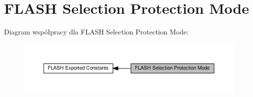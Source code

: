 \hypertarget{group___f_l_a_s_h_ex___selection___protection___mode}{}\section{F\+L\+A\+SH Selection Protection Mode}
\label{group___f_l_a_s_h_ex___selection___protection___mode}
Diagram współpracy dla F\+L\+A\+SH Selection Protection Mode\+:\nopagebreak
\begin{figure}[H]
\begin{center}
\leavevmode
\includegraphics[width=350pt]{group___f_l_a_s_h_ex___selection___protection___mode}
\end{center}
\end{figure}
